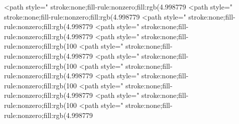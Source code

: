 <path style=" stroke:none;fill-rule:nonzero;fill:rgb(4.998779%
<path style=" stroke:none;fill-rule:nonzero;fill:rgb(4.998779%
<path style=" stroke:none;fill-rule:nonzero;fill:rgb(4.998779%
<path style=" stroke:none;fill-rule:nonzero;fill:rgb(4.998779%
<path style=" stroke:none;fill-rule:nonzero;fill:rgb(100%
<path style=" stroke:none;fill-rule:nonzero;fill:rgb(4.998779%
<path style=" stroke:none;fill-rule:nonzero;fill:rgb(100%
<path style=" stroke:none;fill-rule:nonzero;fill:rgb(4.998779%
<path style=" stroke:none;fill-rule:nonzero;fill:rgb(100%
<path style=" stroke:none;fill-rule:nonzero;fill:rgb(4.998779%
<path style=" stroke:none;fill-rule:nonzero;fill:rgb(100%
<path style=" stroke:none;fill-rule:nonzero;fill:rgb(4.998779%
